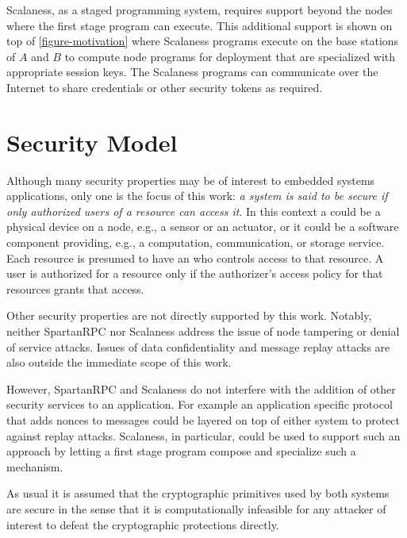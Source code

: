 Scalaness, as a staged programming system, requires support beyond the nodes where the first
stage program can execute. This additional support is shown on top of
\autoref{figure-motivation} where Scalaness programs execute on the base stations of $A$ and $B$
to compute node programs for deployment that are specialized with appropriate session keys. The
Scalaness programs can communicate over the Internet to share credentials or other security
tokens as required.

\section{Security Model}


Although many security properties may be of interest to embedded systems applications, only one
is the focus of this work: \emph{a system is said to be secure if only authorized users of a
  resource can access it}. In this context a  could be a physical device on a
node, e.g., a sensor or an actuator, or it could be a software component providing, e.g., a
computation, communication, or storage service. Each resource is presumed to have an
 who controls access to that resource. A user is authorized for a resource
only if the authorizer's access policy for that resources grants that access.

Other security properties are not directly supported by this work. Notably, neither SpartanRPC
nor Scalaness address the issue of node tampering or denial of service attacks. Issues of data
confidentiality and message replay attacks are also outside the immediate scope of this work.

However, SpartanRPC and Scalaness do not interfere with the addition of other security services
to an application. For example an application specific protocol that adds nonces to messages
could be layered on top of either system to protect against replay attacks. Scalaness, in
particular, could be used to support such an approach by letting a first stage program compose
and specialize such a mechanism.

As usual it is assumed that the cryptographic primitives used by both systems are secure in the
sense that it is computationally infeasible for any attacker of interest to defeat the
cryptographic protections directly.


